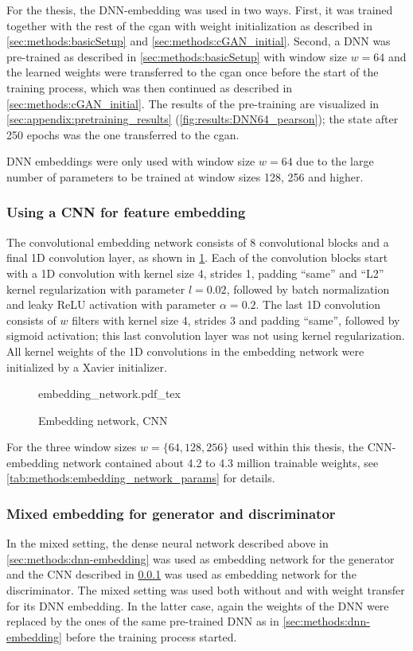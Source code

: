 For the thesis, the DNN-embedding was used in two ways.
First, it was trained together with the rest of the \acrshort{cgan} with weight initialization as described in 
\cref{sec:methods:basicSetup} and \ref{sec:methods:cGAN_initial}.
Second, a DNN was pre-trained as described in \cref{sec:methods:basicSetup} with window size $w=64$
and the learned weights were transferred to the \acrshort{cgan} once before the start of the training process,
which was then continued as described in \cref{sec:methods:cGAN_initial}.
The results of the pre-training are visualized in \cref{sec:appendix:pretraining_results} (\cref{fig:results:DNN64_pearson});
the state after 250 epochs was the one transferred to the \acrshort{cgan}.

DNN embeddings were only used with window size $w=64$ due to the large number of parameters
to be trained at window sizes 128, 256 and higher.

\subsubsection{Using a CNN for feature embedding} \label{sec:methods:cnn-embedding}
The convolutional embedding network consists of 8 convolutional blocks and a final 1D convolution layer, 
as shown in \cref{fig:methods:GAN_arch:embedding_network}.
Each of the convolution blocks start with a 1D convolution with kernel size 4, strides 1, padding ``same'' 
and ``L2'' kernel regularization with parameter $l=0.02$, followed by batch normalization and leaky ReLU activation
with parameter $\alpha=0.2$. 
The last 1D convolution consists of $w$ filters with kernel size 4, strides 3 and padding ``same'',
followed by sigmoid activation; this last convolution layer was not using kernel regularization.
All kernel weights of the 1D convolutions in the embedding network were initialized by a Xavier initializer.
\begin{figure}[p]
    \scriptsize
    \centering
    {embedding_network.pdf_tex}
    \caption{Embedding network, CNN} \label{fig:methods:GAN_arch:embedding_network}
\end{figure}

For the three window sizes $w=\{64,128,256\}$ used within this thesis, the CNN-embedding network 
contained about 4.2 to 4.3 million trainable weights, see \cref{tab:methods:embedding_network_params} for details.

\subsubsection{Mixed embedding for generator and discriminator} \label{sec:methods:mixed-embedding}
In the mixed setting, the dense neural network described above in \cref{sec:methods:dnn-embedding} was used as  
embedding network for the generator and the CNN described in \cref{sec:methods:cnn-embedding} was used as embedding
network for the discriminator.
The mixed setting was used both without and with weight transfer for its DNN embedding.
In the latter case, again the weights of the DNN were replaced by the ones of the same pre-trained DNN as in \cref{sec:methods:dnn-embedding}
 before the training process started.

